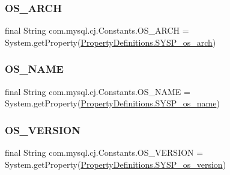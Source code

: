 \subsubsection{\texorpdfstring{O\+S\+\_\+\+A\+R\+CH}{OS\_ARCH}}
{\footnotesize\ttfamily final String com.\+mysql.\+cj.\+Constants.\+O\+S\+\_\+\+A\+R\+CH = System.\+get\+Property(\mbox{\hyperlink{classcom_1_1mysql_1_1cj_1_1conf_1_1_property_definitions_aad0eadeb6d00c44a7e2558ff1d4e999e}{Property\+Definitions.\+S\+Y\+S\+P\+\_\+os\+\_\+arch}})\hspace{0.3cm}{\ttfamily [static]}}

\mbox{\label{classcom_1_1mysql_1_1cj_1_1_constants_ace66e5c19e425e7546de210a129720ee}} 
\subsubsection{\texorpdfstring{O\+S\+\_\+\+N\+A\+ME}{OS\_NAME}}
{\footnotesize\ttfamily final String com.\+mysql.\+cj.\+Constants.\+O\+S\+\_\+\+N\+A\+ME = System.\+get\+Property(\mbox{\hyperlink{classcom_1_1mysql_1_1cj_1_1conf_1_1_property_definitions_affddcdb4224734f2d11b00c102129fd0}{Property\+Definitions.\+S\+Y\+S\+P\+\_\+os\+\_\+name}})\hspace{0.3cm}{\ttfamily [static]}}

\mbox{\label{classcom_1_1mysql_1_1cj_1_1_constants_ad1f1e8ee9d3e10a57303e73dc35df668}} 
\subsubsection{\texorpdfstring{O\+S\+\_\+\+V\+E\+R\+S\+I\+ON}{OS\_VERSION}}
{\footnotesize\ttfamily final String com.\+mysql.\+cj.\+Constants.\+O\+S\+\_\+\+V\+E\+R\+S\+I\+ON = System.\+get\+Property(\mbox{\hyperlink{classcom_1_1mysql_1_1cj_1_1conf_1_1_property_definitions_a5db67a2d1c7d5424b1b8e46c506fc350}{Property\+Definitions.\+S\+Y\+S\+P\+\_\+os\+\_\+version}})\hspace{0.3cm}{\ttfamily [static]}}


